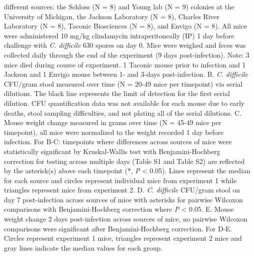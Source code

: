 \documentclass[11pt,]{article}
\begin{document}
different sources: the Schloss (N = 8) and Young lab (N = 9) colonies at
the University of Michigan, the Jackson Laboratory (N = 8), Charles
River Laboratory (N = 8), Taconic Biosciences (N = 8), and Envigo (N =
8). All mice were administered 10 mg/kg clindamycin intraperitoneally
(IP) 1 day before challenge with \emph{C. difficile} 630 spores on day
0. Mice were weighed and feces was collected daily through the end of
the experiment (9 days post-infection). Note: 3 mice died during course
of experiment. 1 Taconic mouse prior to infection and 1 Jackson and 1
Envigo mouse between 1- and 3-days post-infection. B. \emph{C.
difficile} CFU/gram stool measured over time (N = 20-49 mice per
timepoint) via serial dilutions. The black line represents the limit of
detection for the first serial dilution. CFU quantification data was not
available for each mouse due to early deaths, stool sampling
difficulties, and not plating all of the serial dilutions. C. Mouse
weight change measured in grams over time (N = 45-49 mice per
timepoint), all mice were normalized to the weight recorded 1 day before
infection. For B-C: timepoints where differences across sources of mice
were statistically significant by Kruskal-Wallis test with
Benjamini-Hochberg correction for testing across multiple days (Table S1
and Table S2) are reflected by the asterisk(s) above each timepoint (*,
\emph{P} \textless{} 0.05). Lines represent the median for each source
and circles represent individual mice from experiment 1 while triangles
represent mice from experiment 2. D. \emph{C. difficile} CFU/gram stool
on day 7 post-infection across sources of mice with asterisks for
pairwise Wilcoxon comparisons with Benjamini-Hochberg correction where
\emph{P} \textless{} 0.05. E. Mouse weight change 2 days post-infection
across sources of mice, no pairwise Wilcoxon comparisons were
significant after Benjamini-Hochberg correction. For D-E. Circles
represent experiment 1 mice, triangles represent experiment 2 mice and
gray lines indicate the median values for each group.

\newpage
\end{document}
